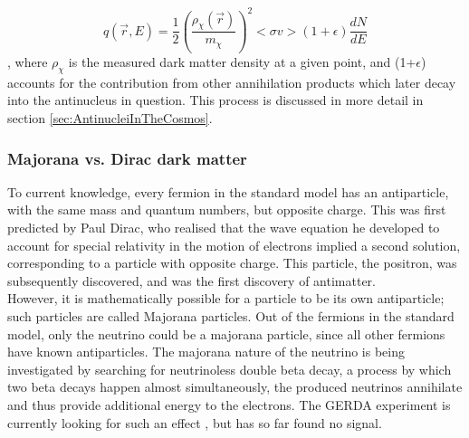 \begin{equation}\label{eq:IntroDM_source_term}
    q(\vec{r}, E) = \frac{1}{2} \left( \frac{\rho_{\chi}(\vec{r})}{m_\chi}\right)^2 <\sigma v > (1+\epsilon) \frac{dN}{dE}
\end{equation}
, where $\rho_\chi$ is the measured dark matter density at a given point, and (1+$\epsilon$) accounts for the contribution from other annihilation products which later decay into the antinucleus in question. This process is discussed in more detail in section \ref{sec:AntinucleiInTheCosmos}.


\subsubsection{Majorana vs. Dirac dark matter}\label{sec:IntroMajoranaDiracDM}
To current knowledge, every fermion in the standard model has an antiparticle, with the same mass and quantum numbers, but opposite charge. This was first predicted by Paul Dirac, who realised that the wave equation he developed to account for special relativity in the motion of electrons implied a second solution, corresponding to a particle with opposite charge\cite{Dirac}. This particle, the positron, was subsequently discovered, and was the first discovery of antimatter\cite{positron_discovery}. \\

However, it is mathematically possible for a particle to be its own antiparticle; such particles are called Majorana particles. Out of the fermions in the standard model, only the neutrino could be a majorana particle, since all other fermions have known antiparticles. The majorana nature of the neutrino is being investigated by searching for neutrinoless double beta decay, a process by which two beta decays happen almost simultaneously, the produced neutrinos annihilate and thus provide additional energy to the electrons. The GERDA experiment is currently looking for such an effect \cite{GERDA}, but has so far found no signal. \\

